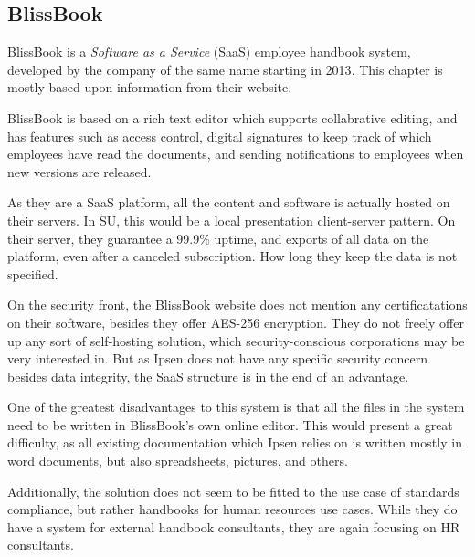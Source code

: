 \subsection{BlissBook}
BlissBook is a \textit{Software as a Service} (SaaS) employee handbook system, developed by the company of the same name starting in 2013\cite{BlissbookInfo}.
This chapter is mostly based upon information from their website\cite{BlissbookContents}.

BlissBook is based on a rich text editor which supports collabrative editing, and has features such as access control, digital signatures to keep track of which employees have read the documents, and sending notifications to employees when new versions are released.

As they are a SaaS platform, all the content and software is actually hosted on their servers.
In SU, this would be a local presentation client-server pattern. %
On their server, they guarantee a 99.9\% uptime, and exports of all data on the platform, even after a canceled subscription.
How long they keep the data is not specified.

On the security front, the BlissBook website does not mention any certificatations on their software, besides they offer AES-256 encryption.\cite{BlissbookSecurity}
They do not freely offer up any sort of self-hosting solution, which security-conscious corporations may be very interested in.
But as Ipsen does not have any specific security concern besides data integrity, the SaaS structure is in the end of an advantage.

One of the greatest disadvantages to this system is that all the files in the system need to be written in BlissBook's own online editor.
This would present a great difficulty, as all existing documentation which Ipsen relies on is written mostly in word documents, but also spreadsheets, pictures, and others.

Additionally, the solution does not seem to be fitted to the use case of standards compliance, but rather handbooks for human resources use cases.
While they do have a system for external handbook consultants, they are again focusing on HR consultants.\cite{BlissbookHandbook}
